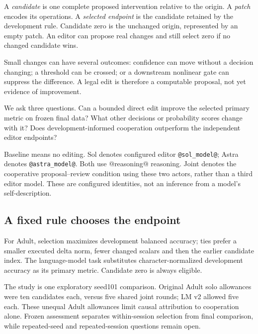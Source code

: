 A \emph{candidate} is one complete proposed intervention relative to the origin. A \emph{patch} encodes its operations. A \emph{selected endpoint} is the candidate retained by the development rule. Candidate zero is the unchanged origin, represented by an empty patch. An editor can propose real changes and still select zero if no changed candidate wins.

Small changes can have several outcomes: confidence can move without a decision changing; a threshold can be crossed; or a downstream nonlinear gate can suppress the difference. A legal edit is therefore a computable proposal, not yet evidence of improvement.

We ask three questions. Can a bounded direct edit improve the selected primary metric on frozen final data? What other decisions or probability scores change with it? Does development-informed cooperation outperform the independent editor endpoints?

Baseline means no editing. Sol denotes configured editor \texttt{@sol_model@}; Astra denotes \texttt{@astra_model@}. Both use @reasoning@ reasoning. Joint denotes the cooperative proposal--review condition using these two actors, rather than a third editor model. These are configured identities, not an inference from a model's self-description.


\subsection*{A fixed rule chooses the endpoint}
For Adult, selection maximizes development balanced accuracy; ties prefer a smaller executed delta norm, fewer changed scalars and then the earlier candidate index. The language-model task substitutes character-normalized development accuracy as its primary metric. Candidate zero is always eligible.

The study is one exploratory seed101 comparison. Original Adult solo allowances were ten candidates each, versus five shared joint rounds; LM v2 allowed five each. These unequal Adult allowances limit causal attribution to cooperation alone. Frozen assessment separates within-session selection from final comparison, while repeated-seed and repeated-session questions remain open.

